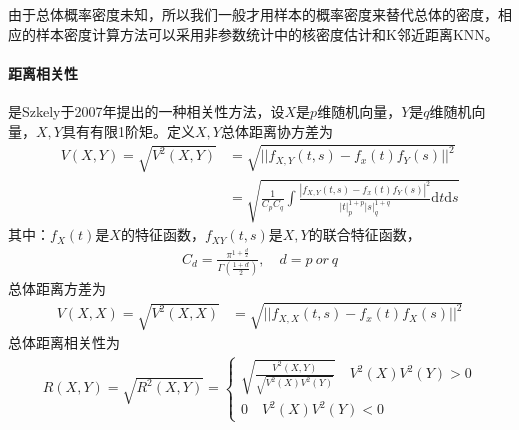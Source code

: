         \par
        由于总体概率密度未知，所以我们一般才用样本的概率密度来替代总体的密度，相应的样本密度计算方法可以采用非参数统计中的核密度估计和K邻近距离KNN。
        \paragraph{距离相关性}是Szkely于2007年提出的一种相关性方法，设$X$是$p$维随机向量，$Y$是$q$维随机向量，$X,Y$具有有限1阶矩。定义$X,Y$总体距离协方差为
        \begin{align*}
        V(X,Y) = \sqrt{V^2(X,Y)} &= \sqrt{||f_{X,Y}(t,s) - f_{x}(t)f_{Y}(s)||^2}\\
        &= \sqrt{\frac{1}{C_pC_q }\int \frac{|f_{X,Y}(t,s) - f_{x}(t)f_{Y}(s)|^2}{|t|_p^{1+p}|s|_q^{1+q}}\mathrm{d}t\mathrm{d}s}
        \end{align*}
        其中：$f_X(t)$是$X$的特征函数，$f_{XY}(t,s)$是$X,Y$的联合特征函数，
        \begin{align*}
        C_d = \frac{\pi^{1+\frac{d}{2}}}{\Gamma \left( \frac{1+d}{2} \right) } ,\quad d = p \ or\ q
        \end{align*}
        总体距离方差为
        \begin{align*}
         V(X,X) = \sqrt{V^2(X,X)} &= \sqrt{||f_{X,X}(t,s) - f_{x}(t)f_{X}(s)||^2}
        \end{align*}
        总体距离相关性为
        \begin{align*}
        R(X,Y) = \sqrt{R^2(X,Y)}=
        \left\{
            \begin{aligned}
            \sqrt{\frac{V^2(X,Y)}{\sqrt{V^2(X)V^2(Y)}}}\quad V^2(X)V^2(Y)>0\\
            0\quad V^2(X)V^2(Y)<0
            \end{aligned}
        \right.
        \end{align*}
